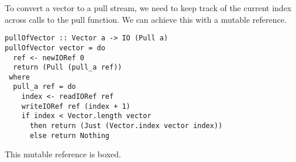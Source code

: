 To convert a vector to a pull stream, we need to keep track of the current index across calls to the pull function.
We can achieve this with a mutable reference.

\begin{lstlisting}
pullOfVector :: Vector a -> IO (Pull a)
pullOfVector vector = do
  ref <- newIORef 0
  return (Pull (pull_a ref))
 where
  pull_a ref = do
    index <- readIORef ref
    writeIORef ref (index + 1)
    if index < Vector.length vector
      then return (Just (Vector.index vector index))
      else return Nothing
\end{lstlisting}

This mutable reference is boxed. 



